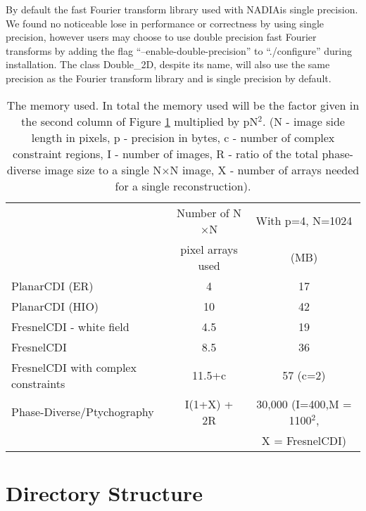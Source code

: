 \documentclass[]{nadia}
\def\name{NADIA}
\begin{document}
By default the fast Fourier transform library used with \name is
single precision. We found no noticeable lose in performance or
correctness by using single precision, however users may choose to use
double precision fast Fourier transforms by adding the flag
``--enable-double-precision'' to ``./configure'' during installation.
The class Double\_2D, despite its name, will also use the same
precision as the Fourier transform library and is single precision by
default.

\begin{table}[h!]
\begin{tabular}[h!]{lcc}
\toprule
&  Number of N$\times$N & With p=4, N=1024 \\
&  pixel arrays used & (MB) \\
\midrule
PlanarCDI (ER) & 4 & 17 \\
PlanarCDI (HIO) & 10 & 42  \\
FresnelCDI - white field & 4.5 & 19 \\
FresnelCDI & 8.5 & 36 \\
FresnelCDI with complex constraints & 11.5+c & 57 (c=2) \\
Phase-Diverse/Ptychography & I(1+X) + 2R & 30,000 (I=400,M = 1100$^2$, \\
 &                 & X = FresnelCDI)  \\
\bottomrule
\end{tabular}

\caption{\label{table:memory}The memory used. 
In total the memory used will be the factor given in the second
column of Figure \ref{table:memory} multiplied by pN$^2$.
(N - image side length in pixels, p - precision in bytes, 
c - number of complex constraint regions, I - number of images, 
R - ratio of the total phase-diverse image size to a single N$\times$N image,
X - number of arrays needed for a single reconstruction). 
}
\end{table}


\newpage

\section{Directory Structure}
\end{document}
